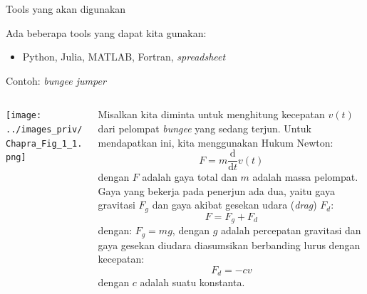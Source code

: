 \begin{frame}{Tools yang akan digunakan}

Ada beberapa tools yang dapat kita gunakan:
\begin{itemize}
\item Python, Julia, MATLAB, Fortran, \emph{spreadsheet}
\end{itemize}

\end{frame}




\begin{frame}{Contoh: \emph{bungee jumper}}

\fontsize{9pt}{10pt}\selectfont

\begin{columns}

\begin{column}{0.2\textwidth}

\texttt{[image: ../images\_priv/Chapra\_Fig\_1\_1.png]}

\end{column}

\begin{column}{0.8\textwidth}
Misalkan kita diminta untuk menghitung kecepatan $v(t)$ dari pelompat
\emph{bungee} yang sedang terjun. Untuk mendapatkan ini, kita
menggunakan Hukum Newton:
\begin{equation*}
F = m \frac{\mathrm{d}}{\mathrm{d}t} v(t)
\end{equation*}
dengan $F$ adalah gaya total dan $m$ adalah massa pelompat.
Gaya yang bekerja pada penerjun ada dua, yaitu gaya gravitasi \(F_{g}\) dan
gaya akibat gesekan udara (\emph{drag})
$F_{d}$:
\begin{equation*}
F = F_{g} + F_{d}
\end{equation*}
dengan: $F_{g} = mg$, dengan $g$ adalah percepatan gravitasi dan gaya
gesekan diudara diasumsikan berbanding lurus dengan kecepatan:
\begin{equation*}
F_{d} = -c v  
\end{equation*}
dengan $c$ adalah suatu konstanta.
\end{column}

\end{columns}

\end{frame}


